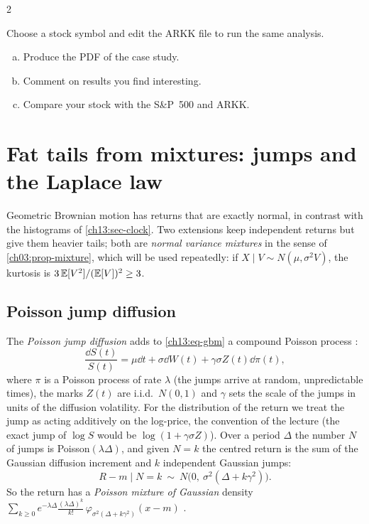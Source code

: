 \begin{paracol}{2}
\begin{exercise}\label{ch13:ex-ps5-p5}
Choose a stock symbol and edit the ARKK file to run the same analysis.
\begin{enumerate}[(a)]
  \item Produce the PDF of the case study.
  \item Comment on results you find interesting.
  \item Compare your stock with the S\&P~500 and ARKK.
\end{enumerate}
\end{exercise}


\section{Fat tails from mixtures: jumps and the Laplace law}\label{ch13:sec-mix}
Geometric Brownian motion has returns that are exactly normal, in contrast with the histograms of \cref{ch13:sec-clock}.
Two extensions keep independent returns but give them heavier tails; both are \emph{normal variance mixtures} in the sense of
\cref{ch03:prop-mixture}, which will be used repeatedly: if $X\mid V\sim N(\mu,\sigma^2V)$, the kurtosis is $3\,\mathbb{E}[V^2]/(\mathbb{E}[V])^2\ge3$.

\subsection{Poisson jump diffusion}\label{ch13:sec-pjd}
The \emph{Poisson jump diffusion} adds to \eqref{ch13:eq-gbm} a compound Poisson process :
\begin{equation}\label{ch13:eq-pjd}
  \frac{\dd S(t)}{S(t)}=\mu\dd t+\sigma\dd W(t)+\gamma\sigma Z(t)\dd\pi(t),
\end{equation}
where $\pi$ is a Poisson process of rate $\lambda$ (the jumps arrive at random, unpredictable times), the marks $Z(t)$ are i.i.d.\ $N(0,1)$ and
$\gamma$ sets the scale of the jumps in units of the diffusion volatility. For the distribution of the return we treat the jump as acting additively on the log-price, the convention of the
lecture (the exact jump of $\log S$ would be $\log(1+\gamma\sigma Z)$). Over a period $\Delta$ the number $N$ of jumps is Poisson$(\lambda\Delta)$, and given $N=k$ the centred return is the sum of the
Gaussian diffusion increment and $k$ independent Gaussian jumps:
\[
  R-m\mid N=k\ \sim\ N\bigl(0,\ \sigma^2(\Delta+k\gamma^2)\bigr).
\]
So the return has a \emph{Poisson mixture of Gaussian} density $\sum_{k\ge0}e^{-\lambda\Delta}\frac{(\lambda\Delta)^k}{k!}\,\varphi_{\sigma^2(\Delta+k\gamma^2)}(x-m)$ .


\end{paracol}
